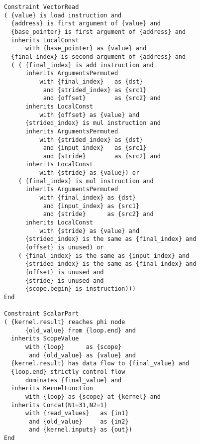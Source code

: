 \begin{figure}[p]
\begin{lstlisting}[language=IDL,basicstyle=\linespread{0.8}\ttfamily,
                   firstnumber=31]
Constraint VectorRead
( {value} is load instruction and
  {address} is first argument of {value} and
  {base_pointer} is first argument of {address} and
  inherits LocalConst
      with {base_pointer} as {value} and
  {final_index} is second argument of {address} and
  ( ( {final_index} is add instruction and
      inherits ArgumentsPermuted
          with {final_index}   as {dst}
           and {strided_index} as {src1}
           and {offset}        as {src2} and
      inherits LocalConst
          with {offset} as {value} and
      {strided_index} is mul instruction and
      inherits ArgumentsPermuted
          with {strided_index} as {dst}
           and {input_index}   as {src1}
           and {stride}        as {src2} and
      inherits LocalConst
          with {stride} as {value}) or 
    ( {final_index} is mul instruction and
      inherits ArgumentsPermuted
          with {final_index} as {dst}
           and {input_index} as {src1}
           and {stride}      as {src2} and
      inherits LocalConst
          with {stride} as {value} and
      {strided_index} is the same as {final_index} and
      {offset} is unused) or 
    ( {final_index} is the same as {input_index} and
      {strided_index} is the same as {final_index} and
      {offset} is unused and
      {stride} is unused and
      {scope.begin} is instruction)))
End

Constraint ScalarPart
( {kernel.result} reaches phi node
      {old_value} from {loop.end} and
  inherits ScopeValue
      with {loop}      as {scope}
       and {old_value} as {value} and 
  {kernel.result} has data flow to {final_value} and
  {loop.end} strictly control flow
      dominates {final_value} and
  inherits KernelFunction
      with {loop} as {scope} at {kernel} and
  inherits Concat(N1=31,N2=1)
      with {read_values}   as {in1}
       and {old_value}     as {in2}
       and {kernel.inputs} as {out})
End
\end{lstlisting}
\end{figure}
